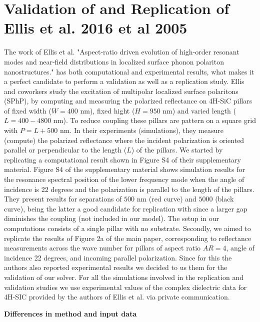 
\section{Validation of \pygbe and Replication of Ellis et al. 2016  et al 2005} \label{chap:rep_val_ellis}
\graphicspath{{replication_validation/figs/}}

The work of Ellis et al. "Aspect-ratio driven evolution of high-order resonant modes and near-field distributions in
localized surface phonon polariton nanostructures." \cite{ellis2016} has both computational and experimental results, what makes 
it a perfect candidate to perform a validation as well as a replication study. Ellis and coworkers study the excitation of 
multipolar localized surface polaritons (SPhP), by computing and measuring the polarized reflectance on 4H-SiC pillars of
fixed width ($W = 400$ nm), fixed hight ($H=950$ nm) and varied length ($L=400-4800$ nm). To reduce coupling these pillars are 
pattern on a square grid with $P = L + 500$ nm. In their experiments (simulations), they measure (compute) the polarized reflectance
where the incident polarization is oriented parallel or perpendicular to the length ($L$) of the pillars.
We started by replicating a computational result shown in Figure S4 of their supplementary material. Figure S4 of the 
supplementary material shows simulation results for the resonance spectral position of the lower frequency mode when the angle of 
incidence is 22 degrees and the polarization is parallel to the length of the pillars. They present results for separations of $500$ nm 
(red curve) and $5000$ (black curve), being the latter a good candidate for replication with \pygbe since a larger gap diminishes 
the coupling (not included in our model). The setup in our computations consists of a single pillar with no substrate.
Secondly, we aimed to replicate the results of Figure 2a of the main paper, 
corresponding to reflectance measurements across the wave number for pillars of aspect ratio $AR=4$, angle of incidence 22 degrees, 
and incoming parallel polarization. Since for this the authors also reported experimental results we decided to us them for the 
validation of our solver.
For all the simulations involved in the replication and validation studies we use experimental values of the complex dielectric data 
for 4H-SIC provided by the authors of Ellis et al. via private communication. 

\textbf{Differences in method and input data}

